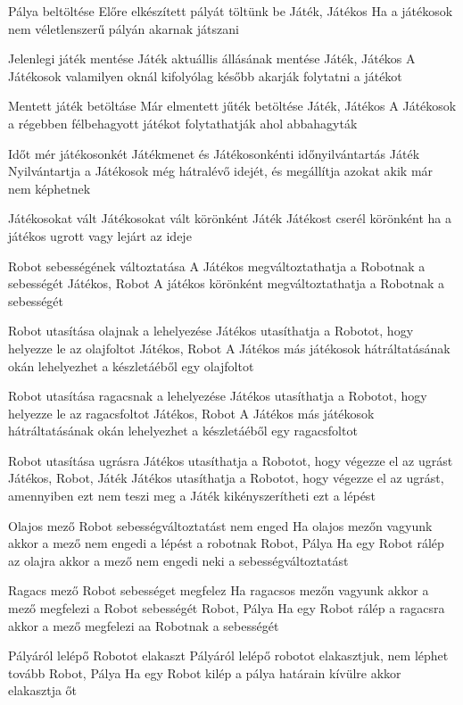 \usecase%
{Pálya beltöltése}%
{Előre elkészített pályát töltünk be}%
{Játék, Játékos}%
{Ha a játékosok nem véletlenszerű pályán akarnak játszani}

\usecase%
{Jelenlegi játék mentése}%
{Játék aktuállis állásának mentése}%
{Játék, Játékos}%
{A Játékosok valamilyen oknál kifolyólag később akarják folytatni a játékot}

\usecase%
{Mentett játék betöltáse}%
{Már elmentett jűték betöltése}%
{Játék, Játékos}%
{A Játékosok a régebben félbehagyott játékot folytathatják ahol abbahagyták}

\usecase%
{Időt mér játékosonkét}%
{Játékmenet és Játékosonkénti időnyilvántartás}%
{Játék}%
{Nyilvántartja a Játékosok még hátralévő idejét, és megállítja azokat akik már nem képhetnek}

\usecase%
{Játékosokat vált}%
{Játékosokat vált körönként}%
{Játék}%
{Játékost cserél körönként ha a játékos ugrott vagy lejárt az ideje}

\usecase%
{Robot sebességének változtatása}%
{A Játékos megváltoztathatja a Robotnak a sebességét}%
{Játékos, Robot}%
{A játékos körönként megváltoztathatja a Robotnak a sebességét}

\usecase%
{Robot utasítása olajnak a lehelyezése}%
{Játékos utasíthatja a Robotot, hogy helyezze le az olajfoltot}%
{Játékos, Robot}%
{A Játékos más játékosok hátráltatásának okán lehelyezhet a készletáéből egy olajfoltot}

\usecase%
{Robot utasítása ragacsnak a lehelyezése}%
{Játékos utasíthatja a Robotot, hogy helyezze le az ragacsfoltot}%
{Játékos, Robot}%
{A Játékos más játékosok hátráltatásának okán lehelyezhet a készletáéből egy ragacsfoltot}

\usecase%
{Robot utasítása ugrásra}%
{Játékos utasíthatja a Robotot, hogy végezze el az ugrást}%
{Játékos, Robot, Játék}%
{Játékos utasíthatja a Robotot, hogy végezze el az ugrást, amennyiben ezt nem teszi meg a Játék kikényszerítheti ezt a lépést}

\usecase%
{Olajos mező Robot sebességváltoztatást nem enged}%
{Ha olajos mezőn vagyunk akkor a mező nem engedi a lépést a robotnak}%
{Robot, Pálya}%
{Ha egy Robot rálép az olajra akkor a mező nem engedi neki a sebességváltoztatást}

\usecase%
{Ragacs mező Robot sebességet megfelez}%
{Ha ragacsos mezőn vagyunk akkor a mező megfelezi a Robot sebességét}%
{Robot, Pálya}%
{Ha egy Robot rálép a ragacsra akkor a mező megfelezi aa Robotnak a sebességét}

\usecase%
{Pályáról lelépő Robotot elakaszt}%
{Pályáról lelépő robotot elakasztjuk, nem léphet tovább}%
{Robot, Pálya}%
{Ha egy Robot kilép a pálya határain kívülre akkor elakasztja őt}

